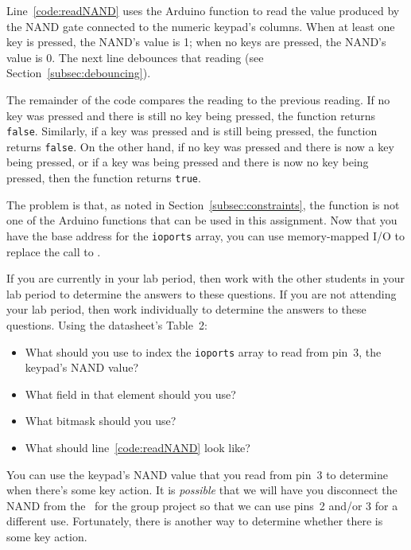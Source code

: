 Line~\ref{code:readNAND} uses the Arduino function  to read the value produced by the NAND gate connected to the numeric keypad's columns.
When at least one key is pressed, the NAND's value is 1;
when no keys are pressed, the NAND's value is 0.
The next line debounces that reading (see Section~\ref{subsec:debouncing}).

The remainder of the code compares the reading to the previous reading.
If no key was pressed and there is still no key being pressed, the function returns \lstinline{false}.
Similarly, if a key was pressed and is still being pressed, the function returns \lstinline{false}.
On the other hand, if no key was pressed and there is now a key being pressed, or if a key was being pressed and there is now no key being pressed, then the function returns \lstinline{true}.

The problem is that, as noted in Section~\ref{subsec:constraints}, the  function is not one of the Arduino functions that can be used in this assignment.
Now that you have the base address for the \lstinline{ioports} array, you can use memory-mapped I/O to replace the call to .

If you are currently in your lab period, then work with the other students in your lab period to determine the answers to these questions.
If you are not attending your lab period, then work individually to determine the answers to these questions.
Using the datasheet's Table~2:
\begin{itemize}
    \item What should you use to index the \lstinline{ioports} array to read from pin~3, the keypad's NAND value?
    \item What field in that element should you use?
    \item What bitmask should you use?
    \item What should line~\ref{code:readNAND} look like?
\end{itemize}

You can use the keypad's NAND value that you read from pin~3 to determine when there's some key action.
It is \textit{possible} that we will have you disconnect the NAND from the \developmentboard\ for the group project so that we can use pins~2 and/or 3 for a different use.
Fortunately, there is another way to determine whether there is some key action.

